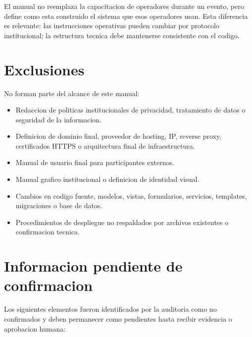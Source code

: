 El manual no reemplaza la capacitacion de operadores durante un evento, pero define como esta construido el sistema que esos operadores usan. Esta diferencia es relevante: las instrucciones operativas pueden cambiar por protocolo institucional; la estructura tecnica debe mantenerse consistente con el codigo.

\section{Exclusiones}
\label{sec:exclusiones}

No forman parte del alcance de este manual:

\begin{itemize}
  \item Redaccion de politicas institucionales de privacidad, tratamiento de datos o seguridad de la informacion.
  \item Definicion de dominio final, proveedor de hosting, IP, reverse proxy, certificados HTTPS o arquitectura final de infraestructura.
  \item Manual de usuario final para participantes externos.
  \item Manual grafico institucional o definicion de identidad visual.
  \item Cambios en codigo fuente, modelos, vistas, formularios, servicios, templates, migraciones o base de datos.
  \item Procedimientos de despliegue no respaldados por archivos existentes o confirmacion tecnica.
\end{itemize}

\section{Informacion pendiente de confirmacion}
\label{sec:informacion-pendiente}

Los siguientes elementos fueron identificados por la auditoria como no confirmados y deben permanecer como pendientes hasta recibir evidencia o aprobacion humana:

